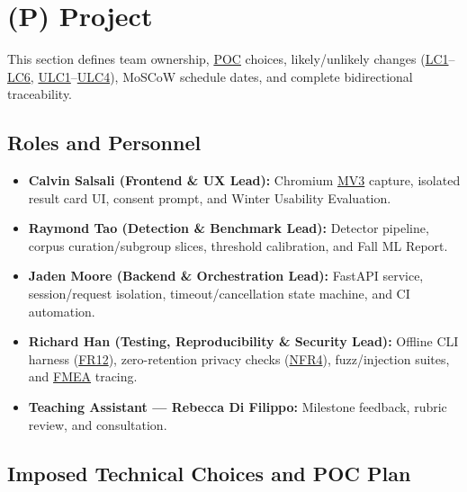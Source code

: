 \documentclass[11pt]{article}
\newcommand{\FMEA}{\hyperlink{acr-fmea}{FMEA}}
\newcommand{\MVThree}{\hyperlink{acr-mv3}{MV3}}
\newcommand{\POC}{\hyperlink{acr-poc}{POC}}
\begin{document}
\newpage

\section*{(P) Project}\label{sec:srs-project}
\renewcommand{\thesubsection}{P.\arabic{subsection}}
\renewcommand{\theHsubsection}{P.\arabic{subsection}}
\setcounter{subsection}{0}

This section defines team ownership, \POC{} choices, likely/unlikely changes (\hyperref[LC1]{LC1}--\hyperref[LC6]{LC6}, \hyperref[ULC1]{ULC1}--\hyperref[ULC4]{ULC4}), MoSCoW schedule dates, and complete bidirectional traceability.

\subsection{Roles and Personnel}\label{subsec:roles}

\begin{itemize}[leftmargin=*, noitemsep]
    \item \textbf{Calvin Salsali (Frontend \& UX Lead):} Chromium \MVThree{} capture, isolated result card UI, consent prompt, and Winter Usability Evaluation.
    \item \textbf{Raymond Tao (Detection \& Benchmark Lead):} Detector pipeline, corpus curation/subgroup slices, threshold calibration, and Fall ML Report.
    \item \textbf{Jaden Moore (Backend \& Orchestration Lead):} FastAPI service, session/request isolation, timeout/cancellation state machine, and CI automation.
    \item \textbf{Richard Han (Testing, Reproducibility \& Security Lead):} Offline CLI harness (\hyperref[FR12]{FR12}), zero-retention privacy checks (\hyperref[NFR4]{NFR4}), fuzz/injection suites, and \FMEA{} tracing.
    \item \textbf{Teaching Assistant --- Rebecca Di Filippo:} Milestone feedback, rubric review, and consultation.
\end{itemize}

\subsection{Imposed Technical Choices and POC Plan}\label{subsec:tech-choices}
\end{document}
